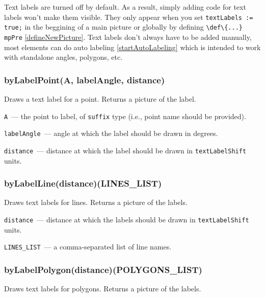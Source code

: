 Text labels are turned off by default. As a result, simply adding code for text labels won't make them visible. They only appear when you set \texttt{textLabels := true;} in the beggining of a main picture or globally by defining \texttt{\textbackslash def\textbackslash\{...\} mpPre} \ref{defineNewPicture}. Text labels don't always have to be added manually, most elements can do auto labeling \ref{startAutoLabeling} which is intended to work with standalone angles, polygons, etc. 


\subsubsection{byLabelPoint(A, labelAngle, distance)}\label{byLabelPoint}
Draws a text label for a point. Returns a picture of the label.
	
	\texttt{A}~— the point to label, of \texttt{suffix} type (i.e., point name should be provided).
	
	\texttt{labelAngle}~— angle at which the label should be drawn in degrees.
	
	\texttt{distance}~— distance at which the label should be drawn in \texttt{textLabelShift} units.

\subsubsection{byLabelLine(distance)(LINES\_LIST)}\label{byLabelLine}
	
	Draws text labels for lines. Returns a picture of the labels.
	
	\texttt{distance}~— distance at which the labels should be drawn in \texttt{textLabelShift} units.
	
	\texttt{LINES\_LIST}~— a comma-separated list of line names.

\subsubsection{byLabelPolygon(distance)(POLYGONS\_LIST)}\label{byLabelPolygon}
	
	Draws text labels for polygons. Returns a picture of the labels.
	
